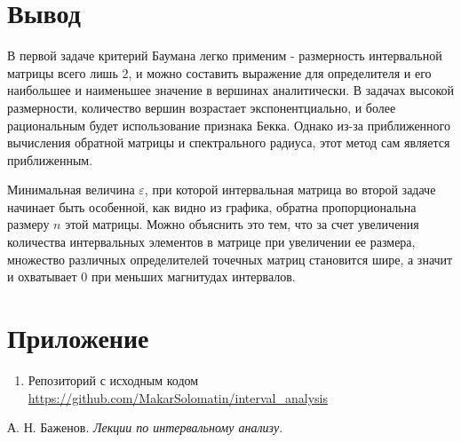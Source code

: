 \documentclass[14pt,a4paper,article]{ncc}
\begin{document}
\section{Вывод}
В первой задаче критерий Баумана легко применим - размерность интервальной матрицы всего лишь 2,
и можно составить выражение для определителя и его наибольшее и наименьшее значение в вершинах аналитически.
В задачах высокой размерности, количество вершин возрастает экспонентциально, и более рациональным будет 
использование признака Бекка.
Однако из-за приближенного вычисления обратной матрицы и спектрального радиуса, 
этот метод сам является приближенным.

Минимальная величина $\varepsilon$, при которой интервальная матрица во второй задаче начинает
быть особенной, как видно из графика, обратна пропорциональна размеру $n$ этой матрицы.
Можно объяснить это тем, что за счет увеличения количества интервальных элементов в матрице при
увеличении ее размера, множество различных определителей точечных матриц становится шире, а значит и охватывает $0$ при меньших магнитудах интервалов.

\section{Приложение}
\begin{enumerate}
    \item Репозиторий с исходным кодом \\ \url{https://github.com/MakarSolomatin/interval_analysis}
\end{enumerate}

\begin{thebibliography}{9}
     А. Н. Баженов. \textit{Лекции по интервальному анализу}.
\end{thebibliography}
\end{document}
